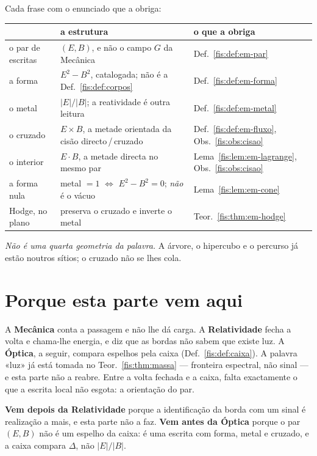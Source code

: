 \documentclass[livro.tex]{subfiles}
\begin{document}
\medskip\noindent Cada frase com o enunciado que a obriga:
\begin{center}\small
\begin{tabular}{@{}p{}p{}l@{}}
\toprule
 & \textbf{a estrutura} & \textbf{o que a obriga} \\
\midrule
o par de escritas & $(E,B)$, e não o campo $G$ da Mecânica & Def.~\ref{fis:def:em-par} \\
a forma & $E^{2}-B^{2}$, catalogada; não é a Def.~\ref{fis:def:corpos} & Def.~\ref{fis:def:em-forma} \\
o metal & $\lvert E\rvert/\lvert B\rvert$; a reatividade é outra leitura & Def.~\ref{fis:def:em-metal} \\
o cruzado & $E\times B$, a metade orientada da cisão directo\,/\,cruzado & Def.~\ref{fis:def:em-fluxo}, Obs.~\ref{fis:obs:cisao} \\
o interior & $E\cdot B$, a metade directa no mesmo par & Lema~\ref{fis:lem:em-lagrange}, Obs.~\ref{fis:obs:cisao} \\
a forma nula & metal $=1$ $\iff$ $E^{2}-B^{2}=0$; \emph{não} é o vácuo & Lema~\ref{fis:lem:em-cone} \\
Hodge, no plano & preserva o cruzado e inverte o metal & Teor.~\ref{fis:thm:em-hodge} \\
\bottomrule
\end{tabular}
\end{center}

\medskip\noindent\emph{Não é uma quarta geometria da palavra.} A árvore, o
hipercubo e o percurso já estão noutros sítios; o cruzado não se lhes cola.

\section{Porque esta parte vem aqui}\label{fis:em-porque}

\noindent A \textbf{Mecânica} conta a passagem e não lhe dá carga. A
\textbf{Relatividade} fecha a volta e chama-lhe energia, e diz que as bordas não
sabem que existe luz. A \textbf{Óptica}, a seguir, compara espelhos pela caixa
(Def.~\ref{fis:def:caixa}). A palavra «luz» já está tomada no
Teor.~\ref{fis:thm:massa} --- fronteira espectral, não sinal --- e esta parte
não a reabre. Entre a volta fechada e a caixa, falta exactamente o que a
escrita local não esgota: a orientação do par.

\medskip\noindent\textbf{Vem depois da Relatividade} porque a identificação da
borda com um sinal é realização a mais, e esta parte não a faz. \textbf{Vem
antes da Óptica} porque o par $(E,B)$ não é um espelho da caixa: é uma escrita
com forma, metal e cruzado, e a caixa compara $\Delta$, não $\lvert E\rvert/\lvert B\rvert$.
\end{document}

